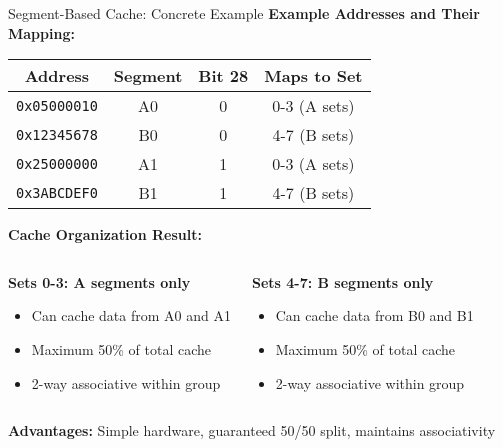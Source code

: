 \documentclass[aspectratio=169,12pt]{beamer}
\begin{document}
\begin{frame}{Segment-Based Cache: Concrete Example}
\textbf{Example Addresses and Their Mapping:}

\begin{center}
\begin{tabular}{|c|c|c|c|}
\hline
\textbf{Address} & \textbf{Segment} & \textbf{Bit 28} & \textbf{Maps to Set} \\
\hline
\texttt{0x05000010} & A0 & 0 & 0-3 (A sets) \\
\texttt{0x12345678} & B0 & 0 & 4-7 (B sets) \\
\texttt{0x25000000} & A1 & 1 & 0-3 (A sets) \\
\texttt{0x3ABCDEF0} & B1 & 1 & 4-7 (B sets) \\
\hline
\end{tabular}
\end{center}

\pause
\vspace{0.5cm}
\textbf{Cache Organization Result:}
\begin{columns}
\begin{center}
\textbf{Sets 0-3: A segments only}
\begin{itemize}
    \item Can cache data from A0 and A1
    \item Maximum 50\% of total cache
    \item 2-way associative within group
\end{itemize}
\end{center}

\begin{center}
\textbf{Sets 4-7: B segments only}
\begin{itemize}
    \item Can cache data from B0 and B1
    \item Maximum 50\% of total cache
    \item 2-way associative within group
\end{itemize}
\end{center}
\end{columns}

\begin{tcolorbox}[colback=green!10]
\textbf{Advantages:} Simple hardware, guaranteed 50/50 split, maintains associativity
\end{tcolorbox}
\end{frame}
\end{document}
